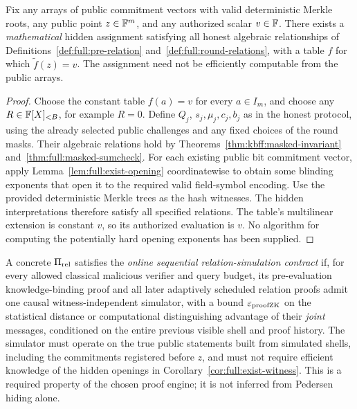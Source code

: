 \begin{corollary}\label{cor:full:exist-witness}
Fix any arrays of public
commitment vectors with
valid deterministic Merkle
roots, any public point
$z\in\mathbb{F}^m$, and any
authorized scalar $v\in\mathbb{F}$.
There exists a \emph{mathematical}
hidden assignment satisfying
all honest algebraic
relationships of
Definitions~\ref{def:full:pre-relation}
and~\ref{def:full:round-relations},
with a table $f$ for which
$\widetilde f(z)=v$.
The assignment need not be
efficiently computable from
the public arrays.
\end{corollary}
\begin{proof}
Choose the constant table
$f(a)=v$ for every $a\in I_m$,
and choose any
$R\in\mathbb{F}[X]_{<B}$, for example
$R=0$. Define $Q_j$,
$s_j,\mu_j,c_j,b_j$
as in the honest protocol,
using the already selected
public challenges and any
fixed choices of the round
masks. Their algebraic
relations hold by
Theorems~\ref{thm:kbff:masked-invariant}
and~\ref{thm:full:masked-sumcheck}.
For each existing public
bit commitment vector, apply
Lemma~\ref{lem:full:exist-opening}
coordinatewise to obtain
some blinding exponents that
open it to the required valid
field-symbol encoding. Use
the provided deterministic
Merkle trees as the hash
witnesses. The hidden
interpretations therefore
satisfy all specified
relations. The table's
multilinear extension is
constant $v$, so its
authorized evaluation is $v$.
No algorithm for computing
the potentially hard opening
exponents has been supplied.
\end{proof}

\begin{definition}\label{def:full:zk-contract}
A concrete $\Pi_{\rm rel}$ satisfies
the \emph{online sequential
relation-simulation contract}
if, for every allowed classical
malicious verifier and query
budget, its pre-evaluation
knowledge-binding proof and
all later adaptively scheduled
relation proofs admit one
causal witness-independent
simulator, with a bound
$\varepsilon_{\rm proofZK}$ on
the statistical distance or
computational distinguishing
advantage of their
\emph{joint} messages,
conditioned on the entire
previous visible shell and
proof history. The simulator
must operate on the true
public statements built from
simulated shells, including
the commitments registered
before $z$, and must not
require efficient knowledge
of the hidden openings
in Corollary~\ref{cor:full:exist-witness}.
This is a required property
of the chosen proof engine;
it is not inferred from
Pedersen hiding alone.
\end{definition}

